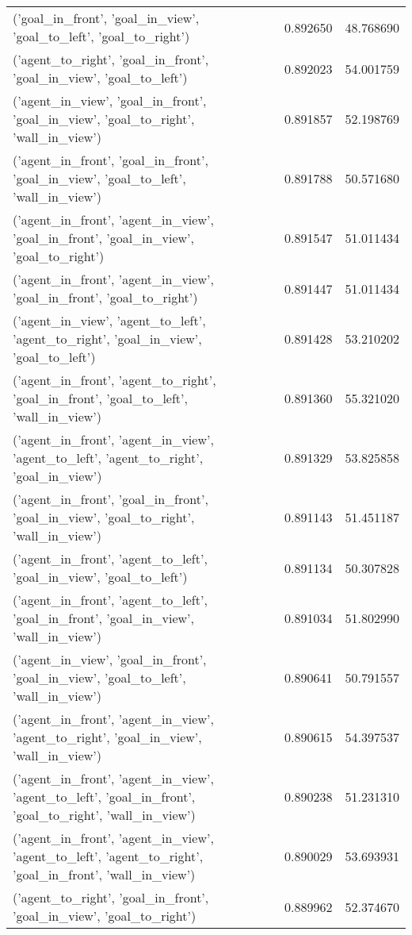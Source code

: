 \begin{tabular}{lrr}
('goal\_in\_front', 'goal\_in\_view', 'goal\_to\_left', 'goal\_to\_right') & 0.892650 & 48.768690 \\
('agent\_to\_right', 'goal\_in\_front', 'goal\_in\_view', 'goal\_to\_left') & 0.892023 & 54.001759 \\
('agent\_in\_view', 'goal\_in\_front', 'goal\_in\_view', 'goal\_to\_right', 'wall\_in\_view') & 0.891857 & 52.198769 \\
('agent\_in\_front', 'goal\_in\_front', 'goal\_in\_view', 'goal\_to\_left', 'wall\_in\_view') & 0.891788 & 50.571680 \\
('agent\_in\_front', 'agent\_in\_view', 'goal\_in\_front', 'goal\_in\_view', 'goal\_to\_right') & 0.891547 & 51.011434 \\
('agent\_in\_front', 'agent\_in\_view', 'goal\_in\_front', 'goal\_to\_right') & 0.891447 & 51.011434 \\
('agent\_in\_view', 'agent\_to\_left', 'agent\_to\_right', 'goal\_in\_view', 'goal\_to\_left') & 0.891428 & 53.210202 \\
('agent\_in\_front', 'agent\_to\_right', 'goal\_in\_front', 'goal\_to\_left', 'wall\_in\_view') & 0.891360 & 55.321020 \\
('agent\_in\_front', 'agent\_in\_view', 'agent\_to\_left', 'agent\_to\_right', 'goal\_in\_view') & 0.891329 & 53.825858 \\
('agent\_in\_front', 'goal\_in\_front', 'goal\_in\_view', 'goal\_to\_right', 'wall\_in\_view') & 0.891143 & 51.451187 \\
('agent\_in\_front', 'agent\_to\_left', 'goal\_in\_view', 'goal\_to\_left') & 0.891134 & 50.307828 \\
('agent\_in\_front', 'agent\_to\_left', 'goal\_in\_front', 'goal\_in\_view', 'wall\_in\_view') & 0.891034 & 51.802990 \\
('agent\_in\_view', 'goal\_in\_front', 'goal\_in\_view', 'goal\_to\_left', 'wall\_in\_view') & 0.890641 & 50.791557 \\
('agent\_in\_front', 'agent\_in\_view', 'agent\_to\_right', 'goal\_in\_view', 'wall\_in\_view') & 0.890615 & 54.397537 \\
('agent\_in\_front', 'agent\_in\_view', 'agent\_to\_left', 'goal\_in\_front', 'goal\_to\_right', 'wall\_in\_view') & 0.890238 & 51.231310 \\
('agent\_in\_front', 'agent\_in\_view', 'agent\_to\_left', 'agent\_to\_right', 'goal\_in\_front', 'wall\_in\_view') & 0.890029 & 53.693931 \\
('agent\_to\_right', 'goal\_in\_front', 'goal\_in\_view', 'goal\_to\_right') & 0.889962 & 52.374670 \\

\end{tabular}
